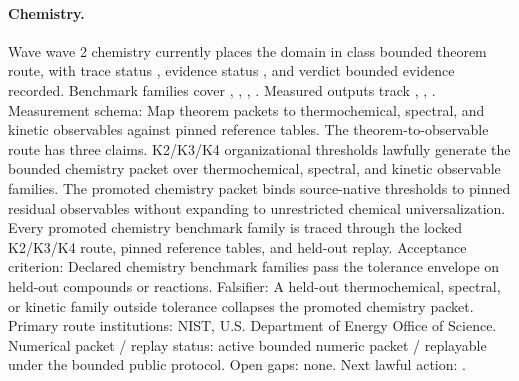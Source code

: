 \paragraph{Chemistry.}
Wave wave 2 chemistry currently places the domain in class bounded theorem route, with trace status , evidence status , and verdict bounded evidence recorded.
Benchmark families cover , \allowbreak {}, \allowbreak {}, \allowbreak {}.
Measured outputs track , \allowbreak {}, \allowbreak {}.
Measurement schema: Map theorem packets to thermochemical, spectral, and kinetic observables against pinned reference tables.
The theorem-to-observable route has three claims. K2/K3/K4 organizational thresholds lawfully generate the bounded chemistry packet over thermochemical, spectral, and kinetic observable families. The promoted chemistry packet binds source-native thresholds to pinned residual observables without expanding to unrestricted chemical universalization. Every promoted chemistry benchmark family is traced through the locked K2/K3/K4 route, pinned reference tables, and held-out replay.
Acceptance criterion: Declared chemistry benchmark families pass the tolerance envelope on held-out compounds or reactions.
Falsifier: A held-out thermochemical, spectral, or kinetic family outside tolerance collapses the promoted chemistry packet.
Primary route institutions: NIST, \allowbreak U.S. Department of Energy Office of Science.
Numerical packet / replay status: active bounded numeric packet / replayable under the bounded public protocol.
Open gaps: none.
Next lawful action: .

